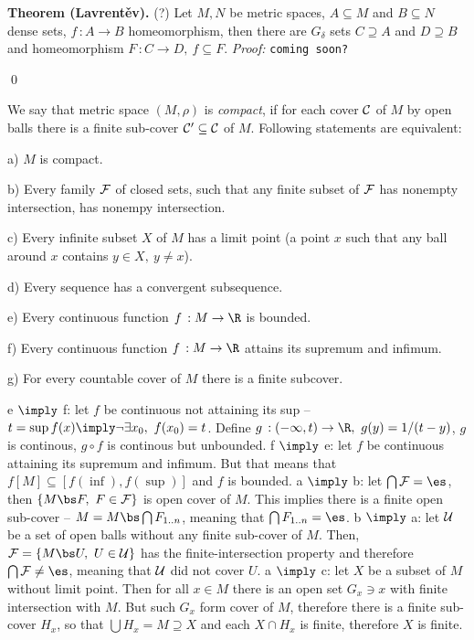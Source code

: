 \medskip
{\bf Theorem (Lavrent\v ev).} (?) Let $M,N$ be metric spaces, $A\subseteq M$ 
and $B\subseteq N$ dense sets, $f\,:A\to B$ homeomorphism, then there are 
$G_\delta$ sets $C\supseteq A$ and $D\supseteq B$ and homeomorphism $F\,:
C\to D,\ f\subseteq F$.
\smallskip
{\it Proof:} {\tt coming soon?}

\qed
\medskip


 We say that metric space $(M,\rho)$ is {\it compact}, if for 
each cover $\cal C$ of $M$ by open balls there is a finite sub-cover $\cal 
C'\subseteq C$ of $M$. Following statements are equivalent:
{\parindent0.5in\parskip6pt
	\item{a)} $M$ is compact.
	\item{b)} Every family $\cal F$ of closed sets, such that any finite 
		subset of $\cal F$ has nonempty intersection, has nonempy intersection.
	\item{c)} Every infinite subset $X$ of $M$ has a limit point (a point 
		$x$ such that any ball around $x$ contains $y\in X,\ y\neq x$).
	\item{d)} Every sequence has a convergent subsequence.
	\item{e)} Every continuous function $f\,:M\to \R$ is bounded.
	\item{f)} Every continuous function $f\,:M\to \R$ attains its supremum and 
		infimum.
	\item{g)} For every countable cover of $M$ there is a finite subcover.

}

\smallskip
e $\imply$ f: let $f$ be continuous not attaining its sup -- $t=\sup f(x) 
\imply \neg \exists x_0,\ f(x_0) = t$. Define $g\,:(-\infty,t)\to \R,\ 
g(y)=1/(t-y)$, $g$ is continous, $g\circ f$ is continous but unbounded.
\smallskip
f $\imply$ e: let $f$ be continuous attaining its supremum and infimum. 
But that means that $f[M] \subseteq [f(\inf),f(\sup)]$ and $f$ is bounded.
\smallskip
a $\imply$ b: let $\bigcap {\cal F} = \es$, then $\{M\bs F,\ F\in {\cal F}\}$ 
is open cover of $M$. This implies there is a finite open sub-cover -- 
$M = M \bs \bigcap F_{1..n}$, meaning that $\bigcap F_{1..n} = \es$.
\smallskip
b $\imply$ a: let $\cal U$ be a set of open balls without any finite sub-cover
of $M$. Then, ${\cal F} = \{M\bs U,\ U\in{\cal U}\}$ has the 
finite-intersection property and therefore $\bigcap \cal F \neq \es$, meaning 
that $\cal U$ did not cover $U$.
\smallskip
a $\imply$ c: let $X$ be a subset of $M$ without limit point. Then for all 
$x\in M$ there is an open set $G_x\ni x$ with finite intersection with $M$.
But such $G_x$ form cover of $M$, therefore there is a finite sub-cover 
$H_x$, so that $\bigcup H_x = M \supseteq X$ and each $X\cap H_x$ is finite, 
therefore $X$ is finite.

